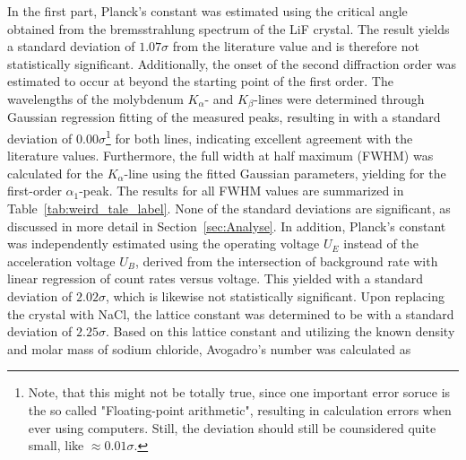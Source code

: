 In the first part, Planck's constant was estimated using the critical angle obtained from the bremsstrahlung spectrum of the LiF crystal. The result
yields a standard deviation of $1.07\sigma$ from the literature value and is therefore not statistically significant. Additionally, the onset of the second diffraction order was estimated to occur at
beyond the starting point of the first order.
The wavelengths of the molybdenum $K_\alpha$- and $K_\beta$-lines were determined through Gaussian regression fitting of the measured peaks, resulting in
with a standard deviation of $0.00\sigma$\footnote{Note, that this might not be totally true, since one important error soruce is the so called "Floating-point arithmetic", resulting in calculation errors when ever using computers. Still, the deviation should still be counsidered quite small, like $\approx 0.01\sigma$.} for both lines, indicating excellent agreement with the literature values. Furthermore, the full width at half maximum (FWHM) was calculated for the $K_\alpha$-line using the fitted Gaussian parameters, yielding
for the first-order $\alpha_1$-peak. The results for all FWHM values are summarized in Table~\ref{tab:weird_tale_label}. None of the standard deviations are significant, as discussed in more detail in Section~\ref{sec:Analyse}.
In addition, Planck's constant was independently estimated using the operating voltage $U_E$ instead of the acceleration voltage $U_B$, derived from the intersection of background rate with linear regression of count rates versus voltage. This yielded
with a standard deviation of $2.02\sigma$, which is likewise not statistically significant.
Upon replacing the crystal with NaCl, the lattice constant was determined to be
with a standard deviation of $2.25\sigma$. Based on this lattice constant and utilizing the known density and molar mass of sodium chloride, Avogadro's number was calculated as

